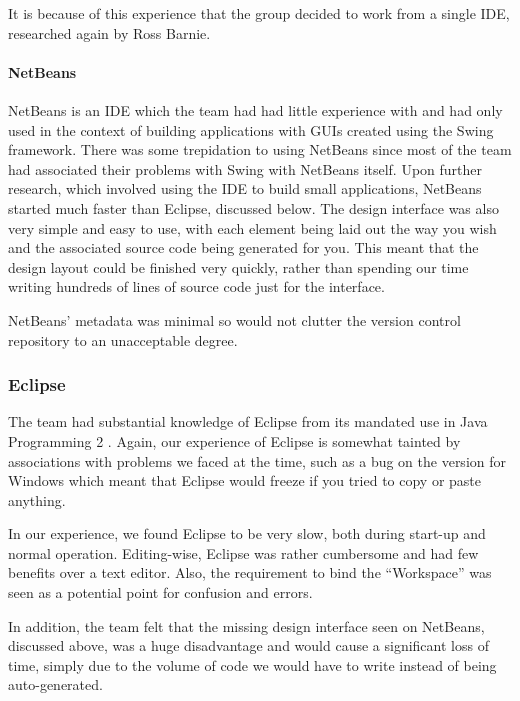It is because of this experience that the group decided to work from a
single IDE, researched again by Ross Barnie.

\paragraph{NetBeans \cite{netbeans}}
\label{impl:ui:ide:netbeans}

NetBeans is an IDE which the team had had little experience with and had
only used in the context of building applications with GUIs created
using the Swing framework.
There was some trepidation to using NetBeans since most of the team
had associated their problems with Swing with NetBeans itself.
Upon further research, which involved using the IDE to build small
applications, NetBeans started much faster than Eclipse, discussed
below.
The design interface was also very simple and easy to use, with each
element being laid out the way you wish and the associated source code
being generated for you.
This meant that the design layout could be finished very quickly,
rather than spending our time writing hundreds of lines of source code
just for the interface.

NetBeans' metadata was minimal so would not clutter the version
control repository to an unacceptable degree.

\subsubsection{Eclipse \cite{eclipse}}
\label{impl:ui:ide:eclipse}

The team had substantial knowledge of Eclipse from its mandated use in
Java Programming 2 \cite{javaProgramming2}. Again, our experience of 
Eclipse is somewhat tainted by associations with problems we faced at 
the time, such as a bug on the version for Windows which meant that 
Eclipse would freeze if you tried to copy or paste anything.

In our experience, we found Eclipse to be very slow, both during 
start-up and normal operation. 
Editing-wise, Eclipse was rather cumbersome and had few benefits over
a text editor.
Also, the requirement to bind the ``Workspace'' was seen as a potential
point for confusion and errors.

In addition, the team felt that the missing design interface seen on
NetBeans, discussed above, was a huge disadvantage and would cause a
significant loss of time, simply due to the volume of code we would
have to write instead of being auto-generated.

